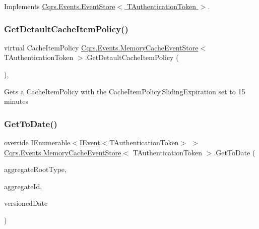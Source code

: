 Implements \hyperlink{classCqrs_1_1Events_1_1EventStore_a0096646f5dff730b0041b9469719c420_a0096646f5dff730b0041b9469719c420}{Cqrs.\+Events.\+Event\+Store$<$ T\+Authentication\+Token $>$}.

\mbox{\label{classCqrs_1_1Events_1_1MemoryCacheEventStore_a2dddf1e1c4c737ad393655ee990953b3_a2dddf1e1c4c737ad393655ee990953b3}} 
\subsubsection{\texorpdfstring{Get\+Detault\+Cache\+Item\+Policy()}{GetDetaultCacheItemPolicy()}}
{\footnotesize\ttfamily virtual Cache\+Item\+Policy \hyperlink{classCqrs_1_1Events_1_1MemoryCacheEventStore}{Cqrs.\+Events.\+Memory\+Cache\+Event\+Store}$<$ T\+Authentication\+Token $>$.Get\+Detault\+Cache\+Item\+Policy (\begin{DoxyParamCaption}{ }\end{DoxyParamCaption})\hspace{0.3cm}{\ttfamily [protected]}, {\ttfamily [virtual]}}



Get\textquotesingle{}s a Cache\+Item\+Policy with the Cache\+Item\+Policy.\+Sliding\+Expiration set to 15 minutes 

\mbox{\label{classCqrs_1_1Events_1_1MemoryCacheEventStore_a2913ce1088ce65a88046763a8f1a46d9_a2913ce1088ce65a88046763a8f1a46d9}} 
\subsubsection{\texorpdfstring{Get\+To\+Date()}{GetToDate()}}
{\footnotesize\ttfamily override I\+Enumerable$<$\hyperlink{interfaceCqrs_1_1Events_1_1IEvent}{I\+Event}$<$T\+Authentication\+Token$>$ $>$ \hyperlink{classCqrs_1_1Events_1_1MemoryCacheEventStore}{Cqrs.\+Events.\+Memory\+Cache\+Event\+Store}$<$ T\+Authentication\+Token $>$.Get\+To\+Date (\begin{DoxyParamCaption}\item[{Type}]{aggregate\+Root\+Type,  }\item[{Guid}]{aggregate\+Id,  }\item[{Date\+Time}]{versioned\+Date }\end{DoxyParamCaption})\hspace{0.3cm}{\ttfamily [virtual]}}



